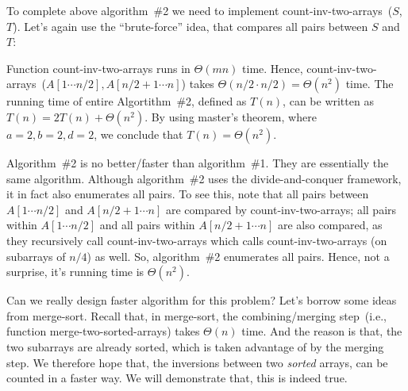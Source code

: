 \begin{minipage}{0.8\textwidth}
	\xxx
	\xxx
	\xxx
	\xxx
	\xxx
	\xxx
	\xxx
\end{minipage}

To complete above algorithm~\#2 we need to implement count-inv-two-arrays~($S$, $T$). 
Let's again use the ``brute-force'' idea, that compares all pairs between $S$ and $T$:

\begin{minipage}{0.8\textwidth}
	\xxx
	\xxx
	\xxx
	\xxx
	\xxx
	\xxx
	\xxx
	\xxx
	\xxx
\end{minipage}

Function count-inv-two-arrays runs in $\Theta(mn)$ time.
Hence, count-inv-two-arrays~($A[1\cdots n/2], A[n/2 + 1\cdots n]$) takes $\Theta(n/2\cdot n/2) = \Theta(n^2)$ time.
The running time of entire Algortithm~\#2, defined as $T(n)$,  can be written as $T(n) = 2T(n) + \Theta(n^2)$.
By using master's theorem, where $a = 2, b=2, d=2$, we conclude that $T(n) = \Theta(n^2)$.

Algorithm~\#2 is no better/faster than algorithm~\#1.
They are essentially the same algorithm. Although algorithm~\#2 uses the divide-and-conquer framework, it in fact
also enumerates all pairs. To see this, note that all pairs between $A[1\cdots n/2]$ and $A[n/2 + 1\cdots n]$ are compared
by count-inv-two-arrays; all pairs within $A[1\cdots n/2]$ and all pairs within $A[n/2 + 1\cdots n]$ are also compared,
as they recursively call count-inv-two-arrays which calls count-inv-two-arrays (on subarrays of $n/4$) as well. 
So, algorithm~\#2 enumerates all pairs. Hence, not a surprise, it's running time is $\Theta(n^2)$.

Can we really design faster algorithm for this problem?
Let's borrow some ideas from merge-sort. Recall that, in merge-sort, the combining/merging step~(i.e., function merge-two-sorted-arrays)
takes $\Theta(n)$ time. And the reason is that, the two subarrays are already sorted, which is taken advantage of by the merging step.
We therefore hope that, the inversions between two \emph{sorted} arrays, can be counted in a faster way. We will demonstrate that, this is
indeed true.

